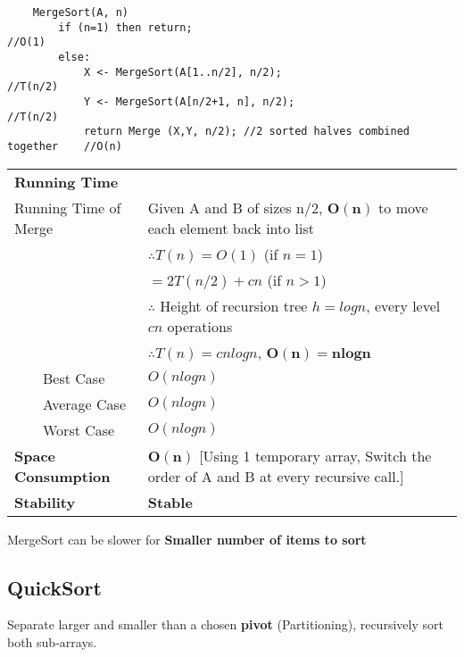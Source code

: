 \documentclass{article}
\newcommand{\tabitem}{~~\llap{\textbullet}~~}
\begin{document}
    \begin{verbatim}
    MergeSort(A, n)
        if (n=1) then return;                                               //O(1)
        else:           
            X <- MergeSort(A[1..n/2], n/2);                                 //T(n/2)
            Y <- MergeSort(A[n/2+1, n], n/2);                               //T(n/2)
            return Merge (X,Y, n/2); //2 sorted halves combined together    //O(n)
    \end{verbatim}
    
    \begin{tabular}{ll}
        \toprule
        \textbf{Running Time} & \\
        Running Time of Merge & Given A and B of sizes n/2, $\bm{O(n)}$ to move each element back into list\\
        & $\therefore T(n) = O(1)$ (if $n = 1$)\\
        & $= 2T(n/2) + cn$ (if $n > 1$)\\
        & $\therefore$ Height of recursion tree $h = logn$, every level $cn$ operations\\
        & $\therefore T(n) = cnlogn$, $\bm{O(n) = nlogn}$\\
        \tabitem Best Case & $O(nlogn)$\\
        \tabitem Average Case & $O(nlogn)$\\
        \tabitem Worst Case & $O(nlogn)$\\
        \midrule
        \textbf{Space Consumption} & $\bm{O(n)}$ [Using 1 temporary array, Switch the order of A and B at
        every recursive call.]\\
        \midrule
        \textbf{Stability} & \textbf{Stable}\\
        \bottomrule
    \end{tabular}

    \bigskip

    MergeSort can be slower for \textbf{Smaller number of items to sort}

    \pagebreak

    \subsection{QuickSort}

    Separate larger and smaller than a chosen \textbf{pivot} (Partitioning), recursively sort both sub-arrays.
    
    \label{partition}
    
\end{document}
